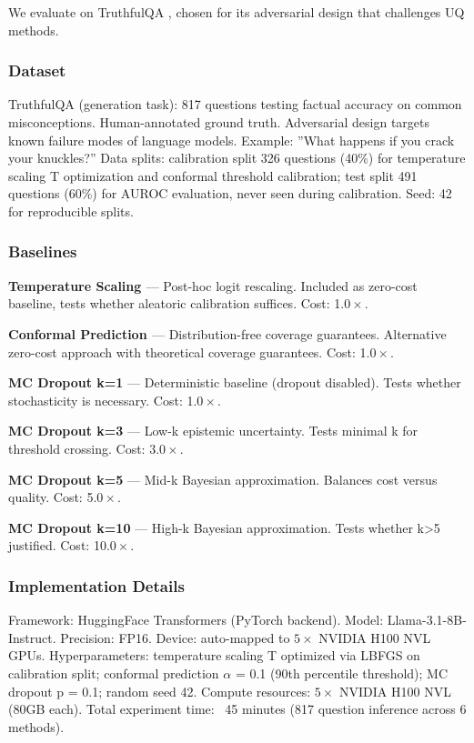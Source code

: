 
We evaluate on TruthfulQA \citep{Lin2021TruthfulQA}, chosen for its adversarial design that challenges UQ methods.

\subsubsection{Dataset}

TruthfulQA (generation task): 817 questions testing factual accuracy on common misconceptions. Human-annotated ground truth. Adversarial design targets known failure modes of language models. Example: ''What happens if you crack your knuckles?'' Data splits: calibration split 326 questions (40\%) for temperature scaling T optimization and conformal threshold calibration; test split 491 questions (60\%) for AUROC evaluation, never seen during calibration. Seed: 42 for reproducible splits.

\subsubsection{Baselines}

\textbf{Temperature Scaling \citep{Guo2017Calibration}} --- Post-hoc logit rescaling. Included as zero-cost baseline, tests whether aleatoric calibration suffices. Cost: 1.$0\times$.

\textbf{Conformal Prediction \citep{Su2024Selective}} --- Distribution-free coverage guarantees. Alternative zero-cost approach with theoretical coverage guarantees. Cost: 1.$0\times$.

\textbf{MC Dropout k=1} --- Deterministic baseline (dropout disabled). Tests whether stochasticity is necessary. Cost: 1.$0\times$.

\textbf{MC Dropout k=3} --- Low-k epistemic uncertainty. Tests minimal k for threshold crossing. Cost: 3.$0\times$.

\textbf{MC Dropout k=5} --- Mid-k Bayesian approximation. Balances cost versus quality. Cost: 5.$0\times$.

\textbf{MC Dropout k=10} --- High-k Bayesian approximation. Tests whether k>5 justified. Cost: 10.$0\times$.

\subsubsection{Implementation Details}

Framework: HuggingFace Transformers (PyTorch backend). Model: Llama-3.1-8B-Instruct. Precision: FP16. Device: auto-mapped to $5\times$ NVIDIA H100 NVL GPUs. Hyperparameters: temperature scaling T optimized via LBFGS on calibration split; conformal prediction $\alpha$ = 0.1 (90th percentile threshold); MC dropout p = 0.1; random seed 42. Compute resources: $5\times$ NVIDIA H100 NVL (80GB each). Total experiment time: ~45 minutes (817 question inference across 6 methods).

